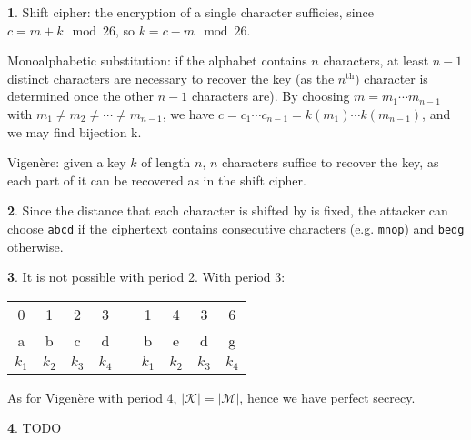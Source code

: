\documentclass{article}
\theoremstyle{definition}
\newcommand{\abs}[1]{\left|#1\right|}
\newcommand{\Ms}{\mathcal{M}} %
\newcommand{\Ks}{\mathcal{K}} %
\theoremstyle{definition}
\theoremstyle{definition}
\newtheorem{solution-internal}{}[subsection]
\newenvironment{solution}{
  \begin{solution-internal}
}{
  \end{solution-internal}
}
\begin{document}
\begin{solution}
  Shift cipher: the encryption of a single character sufficies, since $c = m +
  k \mod 26$, so $k = c - m \mod 26$.
  
  Monoalphabetic substitution: if the alphabet contains $n$ characters, at least
  $n-1$ distinct characters are necessary to recover the key (as the
  $n^{\text{th}})$ character is determined once the other $n-1$ characters are).
  By choosing $m = m_1 \cdots m_{n - 1}$ with $m_1 \neq m_2 \neq \cdots \neq m_{n-1}$, we have $c = c_1 \cdots c_{n-1} = k(m_1) \cdots k(m_{n-1})$, and we may find bijection k.

  Vigenère: given a key $k$ of length $n$, $n$ characters suffice to recover the
  key, as each part of it can be recovered as in the shift cipher.
\end{solution}
\begin{solution}
  Since the distance that each character is shifted by is fixed, the attacker
  can choose {\tt abcd} if the ciphertext contains consecutive characters (e.g.
  {\tt mnop}) and {\tt bedg} otherwise.
\end{solution}

\begin{solution}
  It is not possible with period 2. With period 3:

  \begin{center}
\setlength{\tabcolsep}{2pt}
  \begin{tabular}{cccc p{5mm} cccc}
    0 & 1 & 2 & 3 & & 1 & 4 & 3 & 6 \\
    a & b & c & d & & b & e & d & g \\
    $k_1$ & $k_2$ & $k_3$ & $k_4$ & & $k_1$ & $k_2$ & $k_3$ & $k_4$ \\
  \end{tabular}
  \end{center}

  As for Vigenère with period 4, $\abs{\Ks} = \abs{\Ms}$, hence we have perfect
  secrecy.
\end{solution}

\begin{solution}
  TODO
\end{solution}
\end{document}
